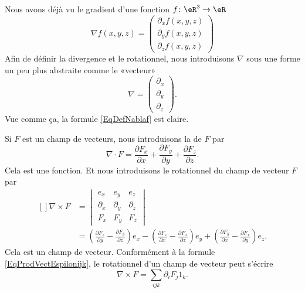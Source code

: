 Nous avons déjà vu le gradient d'une fonction $f\colon \eR^3\to \eR$
\begin{equation}        \label{EqDefNablaf}
    \nabla f(x,y,z)=\begin{pmatrix}
        \partial_xf(x,y,z)    \\ 
        \partial_yf(x,y,z)    \\ 
        \partial_zf(x,y,z)    
    \end{pmatrix}
\end{equation}
Afin de définir la divergence et le rotationnel, nous introduisons $\nabla$ sous une forme un peu plus abstraite comme le «vecteur»
\begin{equation}
    \nabla=\begin{pmatrix}
        \partial_x    \\ 
        \partial_y    \\ 
        \partial_z
    \end{pmatrix}.
\end{equation}
Vue comme ça, la formule \eqref{EqDefNablaf} est claire.

Si $F$ est un champ de vecteurs, nous introduisons la  de $F$ par
\begin{equation}
    \nabla\cdot F=\frac{ \partial F_x }{ \partial x }+\frac{ \partial F_y }{ \partial y }+\frac{ \partial F_z }{ \partial z }.
\end{equation}
Cela est une fonction. Et nous introduisons le rotationnel du champ de vecteur $F$ par
\begin{equation}
    \begin{aligned}[]
        \nabla\times F&=\begin{vmatrix}
              e_x  &   e_y    &   e_z    \\
            \partial_x    &   \partial_y    &   \partial_z    \\
            F_x    &   F_y    &   F_z
        \end{vmatrix}\\
        &=
        \left( \frac{ \partial F_z }{ \partial y }-\frac{ \partial F_y }{ \partial z } \right)e_x
        -\left( \frac{ \partial F_z }{ \partial x }-\frac{ \partial F_x }{ \partial z } \right)e_y
        +\left( \frac{ \partial F_y }{ \partial x }-\frac{ \partial F_x }{ \partial y } \right)e_z.
    \end{aligned}
\end{equation}
Cela est un champ de vecteur. Conformément à la formule \eqref{EqProdVectEspilonijk}, le rotationnel d'un champ de vecteur peut s'écrire
\begin{equation}
    \nabla\times F=\sum_{ijk}\partial_i F_j 1_k.
\end{equation}

